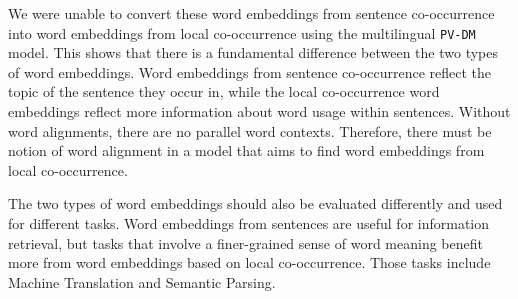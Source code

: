 We were unable to convert these word embeddings from sentence co-occurrence into word embeddings from local co-occurrence using the multilingual \texttt{PV-DM} model.
This shows that there is a fundamental difference between the two types of word embeddings.
Word embeddings from sentence co-occurrence reflect the topic of the sentence they occur in, while the local co-occurrence word embeddings reflect more information about word usage within sentences.
Without word alignments, there are no parallel word contexts.
Therefore, there must be notion of word alignment in a model that aims to find word embeddings from local co-occurrence.

The two types of word embeddings should also be evaluated differently and used for different tasks.
Word embeddings from sentences are useful for information retrieval, but tasks that involve a finer-grained sense of word meaning benefit more from word embeddings based on local co-occurrence.
Those tasks include Machine Translation and Semantic Parsing.